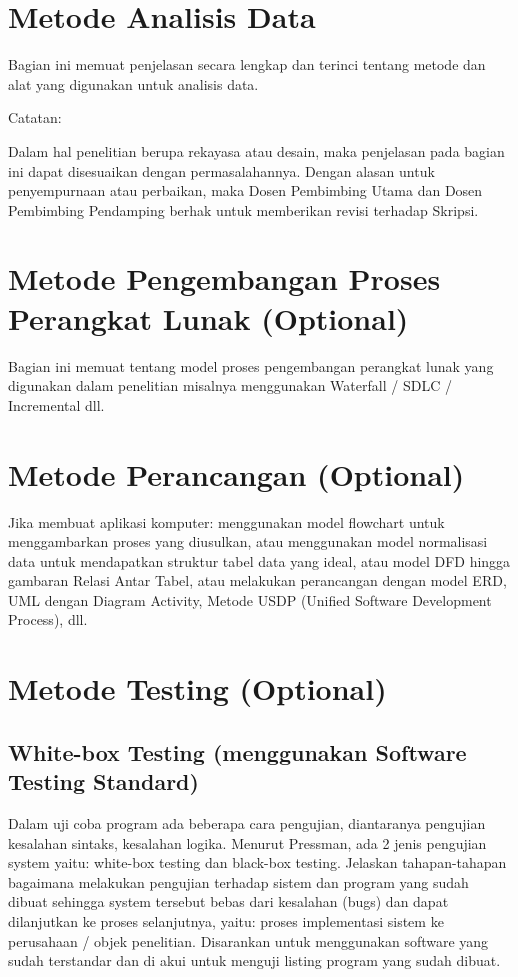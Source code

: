 \documentclass[oneside,listof=totoc]{scrbook}
\begin{document}
\section{Metode Analisis Data}
Bagian ini memuat penjelasan secara lengkap dan terinci tentang metode dan alat yang digunakan untuk analisis data.

\noindent Catatan:

Dalam hal penelitian berupa rekayasa atau desain, maka penjelasan pada bagian ini dapat disesuaikan dengan permasalahannya. Dengan alasan untuk penyempurnaan atau perbaikan, maka Dosen Pembimbing Utama dan Dosen Pembimbing Pendamping berhak untuk memberikan revisi terhadap Skripsi.

\section{Metode Pengembangan Proses Perangkat Lunak (Optional)}
Bagian ini memuat tentang model proses pengembangan perangkat lunak yang digunakan dalam penelitian misalnya menggunakan Waterfall / SDLC / Incremental dll.

\section{Metode Perancangan (Optional)}
Jika membuat aplikasi komputer: menggunakan model flowchart untuk menggambarkan proses yang diusulkan, atau menggunakan model normalisasi data untuk mendapatkan struktur tabel data yang ideal, atau model DFD hingga gambaran Relasi Antar Tabel, atau melakukan perancangan dengan model ERD, UML dengan Diagram Activity, Metode USDP (Unified Software Development Process), dll.

\section{Metode Testing (Optional)}

\subsection{White-box Testing (menggunakan Software Testing Standard)}
Dalam uji coba program ada beberapa cara pengujian, diantaranya pengujian kesalahan sintaks, kesalahan logika. Menurut Pressman, ada 2 jenis pengujian system yaitu: white-box testing dan black-box testing. Jelaskan tahapan-tahapan bagaimana melakukan pengujian terhadap sistem dan program yang sudah dibuat sehingga system tersebut bebas dari kesalahan (bugs) dan dapat dilanjutkan ke proses selanjutnya, yaitu: proses implementasi sistem ke perusahaan / objek penelitian. Disarankan untuk menggunakan software yang sudah terstandar dan di akui untuk menguji listing program yang sudah dibuat.
\end{document}
